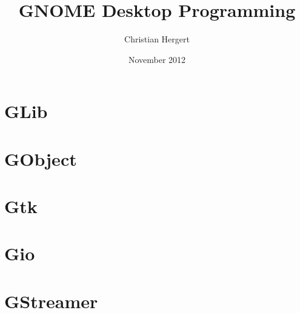 

\title{
    GNOME Desktop Programming
}
\author{Christian Hergert}
\date{November 2012}

\frontmatter
\maketitle
\tableofcontents


\mainmatter
\part{GLib}





\part{GObject}
\part{Gtk}
\part{Gio}
\part{GStreamer}
\appendix


